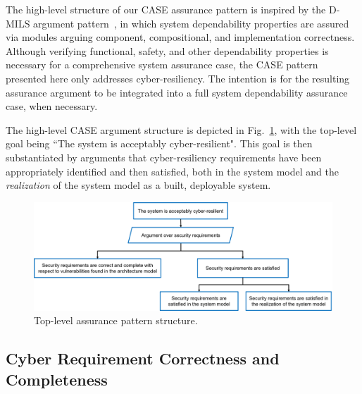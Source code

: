 The high-level structure of our CASE assurance pattern is inspired by the D-MILS argument pattern~\cite{dmils}, in which system dependability properties are assured via modules arguing component, compositional, and implementation correctness.  
Although verifying functional, safety, and other dependability properties is necessary for a comprehensive system assurance case, the CASE pattern presented here only addresses cyber-resiliency.  The intention is for the resulting assurance argument to be integrated into a full system dependability assurance case, when necessary.

The high-level CASE argument structure is depicted in Fig.~\ref{fig:top-level}, with the top-level goal being ``The system is acceptably cyber-resilient".  
This goal is then substantiated by arguments that cyber-resiliency requirements have been appropriately identified and then satisfied, both in the system model and the \textit{realization} of the system model as a built, deployable system.

\begin{figure}[h] 
	\centering 
	\includegraphics[width=\textwidth]{figs/top-level.png}
	\caption{Top-level assurance pattern structure.}
	\label{fig:top-level} 
\end{figure}



\subsection{Cyber Requirement Correctness and Completeness}


